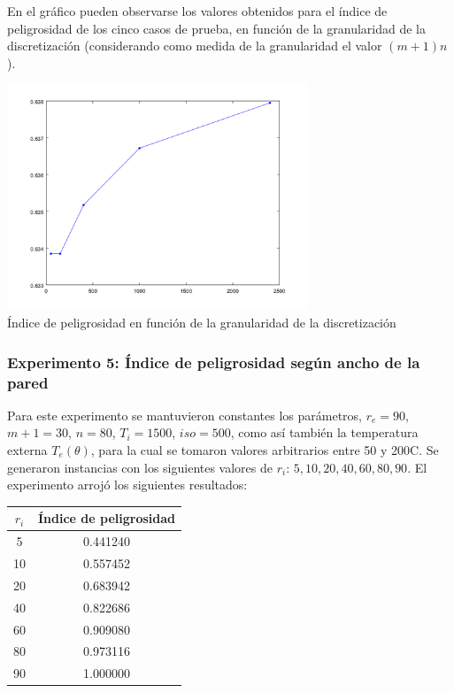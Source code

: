     En el gráfico pueden observarse los valores obtenidos para el índice de peligrosidad de los cinco casos de prueba, en función de la granularidad de la discretización (considerando como medida de la granularidad el valor $(m+1)n$).

    \begin{center}
      \includegraphics[width=9cm]{graficos/4/4.png} \\
      {\small Índice de peligrosidad en función de la granularidad de la discretización}
    \end{center}

  \subsubsection*{Experimento 5: Índice de peligrosidad según ancho de la pared}

    Para este experimento se mantuvieron constantes los parámetros, $r_e = 90$, $m+1 = 30$, $n = 80$, $T_i = 1500$, $iso = 500$, como así también la temperatura externa $T_e(\theta)$, para la cual se tomaron valores arbitrarios entre 50 y 200{\degree}C. Se generaron instancias con los siguientes valores de $r_i$: $5, 10, 20, 40, 60, 80, 90$. El experimento arrojó los siguientes resultados:

    \begin{center}
      \begin{tabular}{c|c}
        $r_i$ & Índice de peligrosidad \\ \hline
        5 & 0.441240 \\
        10 & 0.557452 \\
        20 & 0.683942 \\
        40 & 0.822686 \\
        60 & 0.909080 \\
        80 & 0.973116 \\
        90 & 1.000000
      \end{tabular}
    \end{center}

